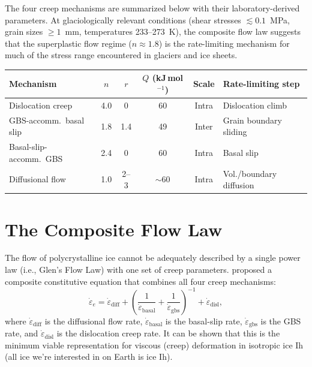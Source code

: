 \documentclass[11pt]{article}
\begin{document}
\begin{tcolorbox}[
  colback=blue!5,
  colframe=blue!50!black,
  title={\textbf{Key point: the dominant creep mechanism depends on conditions}}
]
The four creep mechanisms are summarized below with their laboratory-derived parameters.  At glaciologically relevant conditions (shear stresses $\lesssim 0.1$~MPa, grain sizes $\geq 1$~mm, temperatures 233--273~K), the composite flow law suggests that the superplastic flow regime ($n \approx 1.8$) is the rate-limiting mechanism for much of the stress range encountered in glaciers and ice sheets.

\medskip
\begin{center}
\small
\begin{tabular}{lccccl}
\toprule
\textbf{Mechanism} & $n$ & $r$ & $Q$ (kJ\,mol$^{-1}$) & \textbf{Scale} & \textbf{Rate-limiting step} \\
\midrule
Dislocation creep & 4.0 & 0 & 60 & Intra & Dislocation climb \\
GBS-accomm.\ basal slip & 1.8 & 1.4 & 49 & Inter & Grain boundary sliding \\
Basal-slip-accomm.\ GBS & 2.4 & 0 & 60 & Intra & Basal slip \\
Diffusional flow & 1.0 & 2--3 & $\sim$60 & Intra & Vol./boundary diffusion \\
\bottomrule
\end{tabular}
\end{center}
\end{tcolorbox}

\section{The Composite Flow Law}
\label{sec:composite}

The flow of polycrystalline ice cannot be adequately described by a single power law (i.e., Glen's Flow Law) with one set of creep parameters.  \cite{GoldsbyKohlstedt2001} proposed a composite constitutive equation that combines all four creep mechanisms:
\begin{equation}
  \boxed{\dot{\varepsilon}_e = \dot{\varepsilon}_{\text{diff}} + \left(\frac{1}{\dot{\varepsilon}_{\text{basal}}} + \frac{1}{\dot{\varepsilon}_{\text{gbs}}}\right)^{-1} + \dot{\varepsilon}_{\text{disl}},}
  \label{eq:composite}
\end{equation}
where $\dot{\varepsilon}_{\text{diff}}$ is the diffusional flow rate, $\dot{\varepsilon}_{\text{basal}}$ is the basal-slip rate, $\dot{\varepsilon}_{\text{gbs}}$ is the GBS rate, and $\dot{\varepsilon}_{\text{disl}}$ is the dislocation creep rate. It can be shown that this is the minimum viable representation for viscous (creep) deformation in isotropic ice Ih (all ice we're interested in on Earth is ice Ih). 
\end{document}
